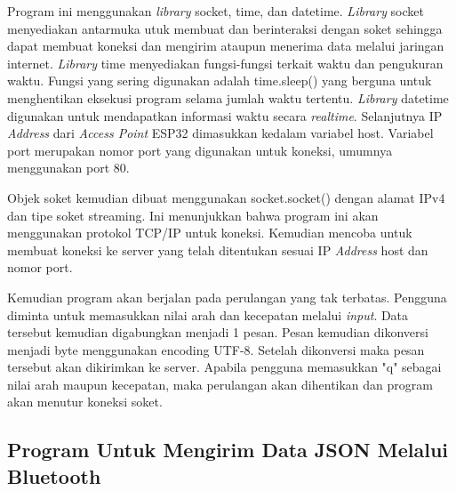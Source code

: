 Program ini menggunakan \emph{library} socket, time, dan datetime. \emph{Library} socket menyediakan antarmuka utuk membuat dan berinteraksi dengan soket sehingga dapat membuat koneksi dan mengirim ataupun menerima data melalui jaringan internet. \emph{Library} time menyediakan fungsi-fungsi terkait waktu dan pengukuran waktu. Fungsi yang sering digunakan adalah time.sleep() yang berguna untuk menghentikan eksekusi program selama jumlah waktu tertentu. \emph{Library} datetime digunakan untuk mendapatkan informasi waktu secara \emph{realtime}. Selanjutnya IP \emph{Address} dari \emph{Access Point} ESP32 dimasukkan kedalam variabel host. Variabel port merupakan nomor port yang digunakan untuk koneksi, umumnya menggunakan port 80.

Objek soket kemudian dibuat menggunakan socket.socket() dengan alamat IPv4 dan tipe soket streaming. Ini menunjukkan bahwa program ini akan menggunakan protokol TCP/IP untuk koneksi. Kemudian mencoba untuk membuat koneksi ke server yang telah ditentukan sesuai IP \emph{Address} host dan nomor port.

Kemudian program akan berjalan pada perulangan yang tak terbatas. Pengguna diminta untuk memasukkan nilai arah dan kecepatan melalui \emph{input}. Data tersebut kemudian digabungkan menjadi 1 pesan. Pesan kemudian dikonversi menjadi byte menggunakan encoding UTF-8. Setelah dikonversi maka pesan tersebut akan dikirimkan ke server. Apabila pengguna memasukkan "q" sebagai nilai arah maupun kecepatan, maka perulangan akan dihentikan dan program akan menutur koneksi soket.

\subsection{Program Untuk Mengirim Data JSON Melalui Bluetooth}

